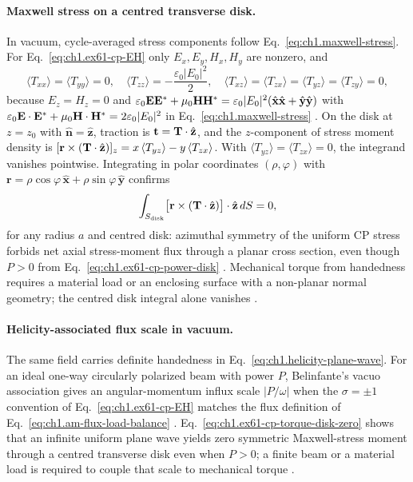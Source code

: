 \paragraph{Maxwell stress on a centred transverse disk.}
In vacuum, cycle-averaged stress components follow Eq.~\eqref{eq:ch1.maxwell-stress}. For Eq.~\eqref{eq:ch1.ex61-cp-EH} only $E_x,E_y,H_x,H_y$ are nonzero, and
\begin{equation}
\label{eq:ch1.ex61-cp-stress-nonzero}
\langle T_{xx}\rangle=\langle T_{yy}\rangle=0,
\quad
\langle T_{zz}\rangle=-\frac{\varepsilon_0|E_0|^2}{2},
\quad
\langle T_{xz}\rangle=\langle T_{zx}\rangle
=\langle T_{yz}\rangle=\langle T_{zy}\rangle=0,
\end{equation}
because $E_z=H_z=0$ and $\varepsilon_0\mathbf{E}\mathbf{E}^*+\mu_0\mathbf{H}\mathbf{H}^*=\varepsilon_0|E_0|^2(\hat{\mathbf{x}}\hat{\mathbf{x}}+\hat{\mathbf{y}}\hat{\mathbf{y}})$ with $\varepsilon_0\mathbf{E}\cdot\mathbf{E}^*+\mu_0\mathbf{H}\cdot\mathbf{H}^*=2\varepsilon_0|E_0|^2$ in Eq.~\eqref{eq:ch1.maxwell-stress} \cite{stratton1941,harrington2001}. On the disk at $z=z_0$ with $\hat{\mathbf{n}}=\hat{\mathbf{z}}$, traction is $\mathbf{t}=\mathbf{T}\cdot\hat{\mathbf{z}}$, and the $z$-component of stress moment density is $[\mathbf{r}\times(\mathbf{T}\cdot\hat{\mathbf{z}})]_z=x\,\langle T_{yz}\rangle-y\,\langle T_{zx}\rangle$. With $\langle T_{yz}\rangle=\langle T_{zx}\rangle=0$, the integrand vanishes pointwise. Integrating in polar coordinates $(\rho,\varphi)$ with $\mathbf{r}=\rho\cos\varphi\,\hat{\mathbf{x}}+\rho\sin\varphi\,\hat{\mathbf{y}}$ confirms
\begin{equation}
\label{eq:ch1.ex61-cp-torque-disk-zero}
\int_{S_{\mathrm{disk}}}\bigl[\mathbf{r}\times(\mathbf{T}\cdot\hat{\mathbf{z}})\bigr]\cdot\hat{\mathbf{z}}\,dS=0,
\end{equation}
for any radius $a$ and centred disk: azimuthal symmetry of the uniform CP stress forbids net axial stress-moment flux through a planar cross section, even though $P>0$ from Eq.~\eqref{eq:ch1.ex61-cp-power-disk} \cite{stratton1941,beth1936}. Mechanical torque from handedness requires a material load or an enclosing surface with a non-planar normal geometry; the centred disk integral alone vanishes \cite{beth1936,stratton1941}.

\paragraph{Helicity-associated flux scale in vacuum.}
The same field carries definite handedness in Eq.~\eqref{eq:ch1.helicity-plane-wave}. For an ideal one-way circularly polarized beam with power $P$, Belinfante's vacuo association gives an angular-momentum influx scale $|P/\omega|$ when the $\sigma=\pm1$ convention of Eq.~\eqref{eq:ch1.ex61-cp-EH} matches the flux definition of Eq.~\eqref{eq:ch1.am-flux-load-balance} \cite{beth1936,belinfante1940,stratton1941}. Eq.~\eqref{eq:ch1.ex61-cp-torque-disk-zero} shows that an infinite uniform plane wave yields zero symmetric Maxwell-stress moment through a centred transverse disk even when $P>0$; a finite beam or a material load is required to couple that scale to mechanical torque \cite{beth1936,stratton1941}.

